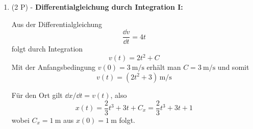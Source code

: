 \documentclass[11pt, a4paper]{article}
\begin{document}
\begin{enumerate}[label=\textbf{\arabic*.},itemsep=0.50cm]
    \item (2 P) - \textbf{Differentialgleichung durch Integration I:}
    \begin{solutionbox}
        Aus der Differentialgleichung
        \[
        \frac{\dd v}{\dd t} = 4t
        \]
        folgt durch Integration
        \[
        v(t) = 2t^2 + C
        \]
        Mit der Anfangsbedingung $v(0)=\SI{3}{\meter\per\second}$ erhält man $C=\SI{3}{\meter\per\second}$ und somit
        \[
        v(t) = \left(2t^2 + 3\right)\,\si{\meter\per\second}
        \]

        Für den Ort gilt $\dd x/\dd t = v(t)$, also
        \[
        x(t) = \frac{2}{3}t^3 + 3t + C_x = \frac{2}{3}t^3 + 3t + 1
        \]
        wobei $C_x=\SI{1}{\meter}$ aus $x(0)=\SI{1}{\meter}$ folgt.
    \end{solutionbox}

\end{enumerate}

\vspace{1cm}
\end{document}
